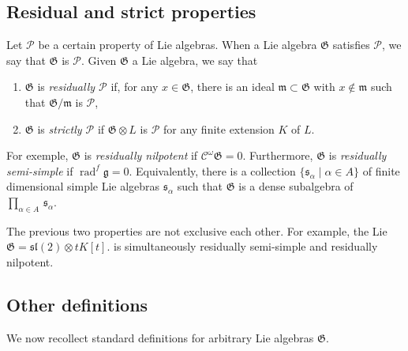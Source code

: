 \documentclass[11pt, letterpaper, reqno]{amsart}
\theoremstyle{definition}
\newcommand{\rad}{\operatorname{rad}}
\newcommand{\cP}{\mathcal P}
\newcommand{\g}{\mathfrak g}
\newcommand{\Cs}{\mathscr C}
\newcommand{\fsl}{\mathfrak{sl}}
\newcommand{\fm}{\mathfrak{m}}
\newcommand{\fs}{\mathfrak{s}}
\newcommand{\fG}{\mathfrak{G}}
\begin{document}
\subsection{Residual and strict properties}
Let $\cP$ be a certain property of Lie algebras.
When a Lie algebra $\fG$ satisfies $\cP$, we say
that $\fG$ is $\cP$. 
Given $\fG$  a Lie algebra, we say that

\begin{enumerate}
\item[(a)] $\fG$ is {\it residually $\cP$}
if, for any $x\in \fG$, there is an ideal
$\fm\subset \fG$ with $x\notin\fm$ such that
$\fG/\fm$ is $\cP$,

\item[(b)] $\fG$ is {\it strictly $\cP$}
if $\fG\otimes L$ is $\cP$ for any finite extension $K$ of $L$.
\end{enumerate}


For exemple,  $\fG$ is  {\it residually nilpotent} if $\Cs^\omega  \fG=0$. 
Furthermore,  $\fG$ is   {\it residually semi-simple} if  $\rad^f\g=0$.
Equivalently, there is a collection $\{\fs_\alpha\mid \alpha\in A\}$ of finite dimensional simple Lie algebras $\fs_\alpha$ such that
$\fG$ is a dense subalgebra of $\prod_{\alpha\in A}\,\fs_\alpha$.





 
The previous two properties are not exclusive each other. For example, the Lie $\fG=\fsl(2)\otimes tK[t]$. is simultaneously residually semi-simple and residually nilpotent.

\subsection{Other definitions}
We now recollect standard definitions for
arbitrary Lie algebras $\fG$.  
\end{document}
